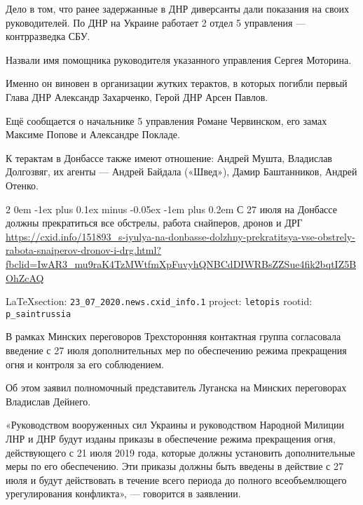 \documentclass[a4paper,11pt]{extreport}
\makeatletter
\renewcommand\subsection{%
  \clearpage
    \@startsection{subsection}%
    {2}%
    {0em}%
    {-1ex plus 0.1ex minus -0.05ex}%
    {-1em plus 0.2em}%
    {\scshape\bfseries\Large}%
}
\makeatother
\begin{document}
Дело в том, что ранее задержанные в ДНР диверсанты дали показания на своих
руководителей.  По ДНР на Украине работает 2 отдел 5 управления --- контрразведка
СБУ.

Назвали имя помощника руководителя указанного управления Сергея Моторина.

Именно он виновен в организации жутких терактов, в которых погибли первый Глава
ДНР Александр Захарченко, Герой ДНР Арсен Павлов.

Ещё сообщается о начальнике 5 управления Романе Червинском, его замах Максиме
Попове и Александре Покладе.

К терактам в Донбассе также имеют отношение: Андрей Мушта, Владислав Долгозвяг,
их агенты --- Андрей Байдала («Швед»), Дамир Баштанников, Андрей Отенко.
 
 
\subsection{С 27 июля на Донбассе должны прекратиться все обстрелы, работа снайперов, дронов и ДРГ}
\label{sec:23_07_2020.news.cxid_info.1}
\url{https://cxid.info/151893_s-iyulya-na-donbasse-dolzhny-prekratitsya-vse-obstrely-rabota-snaiperov-dronov-i-drg.html?fbclid=IwAR3_mu9raK4TzMWtfmXpFuvyhQNBCdDIWRBsZZSue4fik2bqtIZ5BOhZcAQ}
  
\vspace{0.5cm}
{\small\LaTeX section: \verb|23_07_2020.news.cxid_info.1| project: \verb|letopis| rootid: \verb|p_saintrussia|}
\vspace{0.5cm}
  
В рамках Минских переговоров Трехсторонняя контактная группа согласовала
введение с 27 июля дополнительных мер по обеспечению режима прекращения огня и
контроля за его соблюдением.

Об этом заявил полномочный представитель Луганска на Минских переговорах
Владислав Дейнего.

«Руководством вооруженных сил Украины и руководством Народной Милиции ЛНР и ДНР
будут изданы приказы в обеспечение режима прекращения огня, действующего с 21
июля 2019 года, которые должны установить дополнительные меры по его
обеспечению. Эти приказы должны быть введены в действие с 27 июля и будут
действовать в течение всего периода до полного всеобъемлющего урегулирования
конфликта», --- говорится в заявлении.
\end{document}
